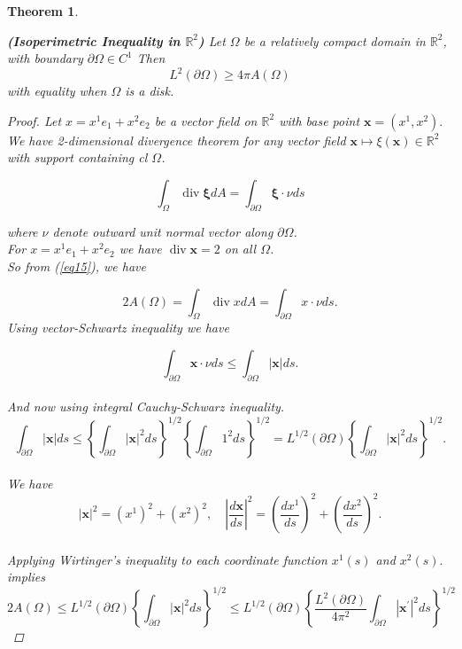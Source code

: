 \documentclass[oneside]{book}
\newtheorem{theorem}{Theorem}[section]
\begin{document}
	\begin{theorem}
		\label{t:2}
		
		\textbf{(Isoperimetric Inequality in $\mathbb{R}^{2}$)} Let $\Omega$ be a relatively compact domain in $\mathbb{R}^{2}$, with boundary $\partial \Omega \in C^{1}$ Then
		\begin{equation}
			\label{eq14}  
			L^{2}(\partial \Omega) \geq 4 \pi A(\Omega) 
		\end{equation}
		with equality when $\Omega$ is a disk.
		
		\begin{proof}
			
			Let $x=x^{1} e_{1}+x^{2} e_{2}$ be a vector field on $\mathbb{R}^{2}$ with base point $\textbf{x}=\left(x^{1}, x^{2}\right) .$
			We have 2-dimensional divergence theorem for any vector
			field $\textbf{x} \mapsto \xi(\textbf{x}) \in \mathbb{R}^{2}$ with support containing cl $\Omega$.
			
			\begin{equation}
				\label{eq15}  
				\int_{\Omega} \operatorname{div} \boldsymbol{\xi} d A=\int_{\partial \Omega} \boldsymbol{\xi} \cdot \nu d s 
			\end{equation} 
			
			where $\nu$ denote outward unit normal vector along $\partial\Omega$. \\
			
			For  $ x=x^{1} e_{1}+x^{2} e_{2}$ we have 
			$\operatorname{div} \textbf{x}=2$ on all $\Omega$. 
			\\ 
			
			So from (\ref{eq15}), we have
			
			$$ 2 A(\Omega)=\int_{\Omega} \operatorname{div} x d A=\int_{\partial \Omega} x \cdot \nu d s.$$ 
			Using vector-Schwartz inequality we have 
			
			$$ \int_{\partial \Omega} \mathbf{x} \cdot \nu d s \leq \int_{\partial \Omega} | \mathbf{x}| d s.  $$ 
			\\
			And now using integral Cauchy-Schwarz inequality. \\
			$$\int_{\partial \Omega}|\mathbf{x}| d s \leq\left\{\int_{\partial \Omega}|\mathbf{x}|^{2} d s\right\}^{1 / 2}\left\{\int_{\partial \Omega} 1^{2} d s\right\}^{1 / 2} =L^{1 / 2}(\partial \Omega)\left\{\int_{\partial \Omega}|\mathbf{x}|^{2} d s\right\}^{1 / 2}.$$ \\ 
			We have  
			$$|\mathbf{x}|^{2} = \left(x^{1}\right)^{2}+\left(x^{2}\right)^{2}, \quad\left|\frac{d \mathbf{x}}{d s}\right|^{2}=\left(\frac{d x^{1}}{d s}\right)^{2}+\left(\frac{d x^{2}}{d s}\right)^{2}.$$\\
			Applying Wirtinger's inequality to each coordinate function $x^{1}(s)$ and $x^{2}(s).$ 
			\\ implies 
			$$ 2 A(\Omega) \leq L^{1 / 2}(\partial \Omega)\left\{\int_{\partial \Omega}|\mathbf{x}|^{2} d s\right\}^{1 / 2} \leq L^{1 / 2}(\partial \Omega)\left\{\frac{L^{2}(\partial \Omega)}{4 \pi^{2}} \int_{\partial \Omega}\left|\mathbf{x}^{\prime}\right|^{2} d s\right\}^{1 / 2}$$
			

\end{proof}
\end{theorem}
\end{document}
